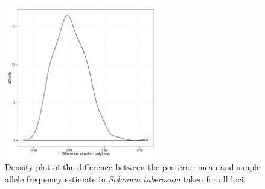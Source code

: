 \documentclass[]{article}
\begin{document}
\begin{figure}[b]
\centering
\includegraphics[width=0.6\textwidth]{pdf/figS3}
\caption{Density plot of the difference between the posterior mean and simple allele frequency estimate in \textit{Solanum tuberosum} taken for all loci.}
\end{figure}
\end{document}
